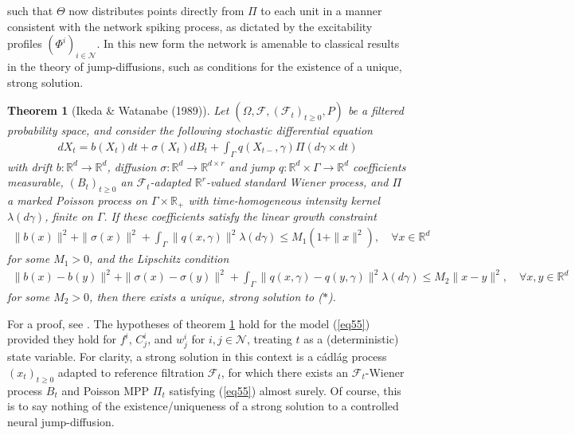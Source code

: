 \documentclass[12pt, oneside]{report}
\newcommand{\mbb}[1]{\mathbb{#1}}
\newcommand{\1}[1]{\mathbbm{1}_{\{#1\}}}
\newcommand{\mc}[1]{\mathcal{#1}}
\newtheorem{theorem}{Theorem}[section]
\theoremstyle{definition}
\begin{document}
such that $\Theta$ now distributes points directly from $\Pi$ to each unit in a
manner consistent with the network spiking process, as dictated by the
excitability profiles $(\Phi^i)_{i\in\mc{N}}$. In this new form the network is
amenable to classical results in the theory of jump-diffusions, such as
conditions for the existence of a unique, strong solution.
\begin{theorem}[Ikeda \& Watanabe (1989)]\label{thm4} Let
    $(\Omega,\mc{F},(\mc{F}_t)_{t\geq 0},P)$ be a filtered probability space,
    and consider the following stochastic differential equation
    \begin{align*}
        dX_t=b(X_t)dt+\sigma(X_t)dB_t+\int_\Gamma q(X_{t-},\gamma)\Pi(d\gamma\times dt)\tag{$\ast$}
    \end{align*}
    with drift $b:\mbb{R}^d\rightarrow\mbb{R}^d$, diffusion
    $\sigma:\mbb{R}^d\rightarrow\mbb{R}^{d\times r}$ and jump
    $q:\mbb{R}^d\times\Gamma\rightarrow\mbb{R}^d$ coefficients measurable,
    $(B_t)_{t\geq 0}$ an $\mc{F}_t$-adapted $\mbb{R}^r$-valued standard Wiener
    process, and $\Pi$ a marked Poisson process on $\Gamma\times\mbb{R}_+$ with
    time-homogeneous intensity kernel $\lambda(d\gamma)$, finite on $\Gamma$. If
    these coefficients satisfy the linear growth constraint
    \begin{align*}
        \|b(x)\|^2+\|\sigma(x)\|^2+\int_\Gamma\|q(x,\gamma)\|^2\lambda(d\gamma)\leq M_1(1+\|x\|^2),\quad\forall x\in\mbb{R}^d
    \end{align*}
    for some $M_1>0$, and the Lipschitz condition
    \begin{align*}
        \|b(x)-b(y)\|^2+\|\sigma(x)-\sigma(y)\|^2+\int_\Gamma\|q(x,\gamma)-q(y,\gamma)\|^2\lambda(d\gamma)\leq M_2\|x-y\|^2,\quad\forall x,y\in\mbb{R}^d
    \end{align*}
    for some $M_2>0$, then there exists a unique, strong solution to ($\ast$).
\end{theorem}
For a proof, see \cite[ch.4 theorem 9.1]{Ikeda_Watanabe_1989}. The hypotheses of
theorem \ref{thm4} hold for the model (\ref{eq55}) provided they hold for $f^i$,
$C^i_j$, and $w^i_j$ for $i,j\in\mc{N}$, treating $t$ as a (deterministic) state
variable. For clarity, a strong solution in this context is a c\'adl\'ag process
$(x_t)_{t\geq 0}$ adapted to reference filtration $\mc{F}_t$, for which there
exists an $\mc{F}_t$-Wiener process $B_t$ and Poisson MPP $\Pi_t$ satisfying
(\ref{eq55}) almost surely. Of course, this is to say nothing of the
existence/uniqueness of a strong solution to a controlled neural jump-diffusion.
\end{document}
